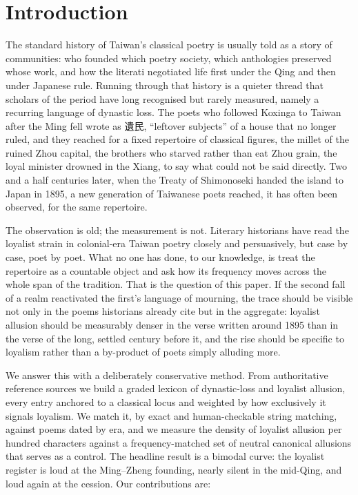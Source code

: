 \documentclass[10pt,twocolumn]{article}
\begin{document}
\section{Introduction}
The standard history of Taiwan's classical poetry is usually told as a story of communities:
who founded which poetry society, which anthologies preserved whose work, and how the
literati negotiated life first under the Qing and then under Japanese rule. Running through
that history is a quieter thread that scholars of the period have long recognised but rarely
measured, namely a recurring language of dynastic loss. The poets who followed Koxinga to
Taiwan after the Ming fell wrote as \mbox{遺民}, ``leftover subjects'' of a house that no
longer ruled, and they reached for a fixed repertoire of classical figures, the millet of
the ruined Zhou capital, the brothers who starved rather than eat Zhou grain, the loyal
minister drowned in the Xiang, to say what could not be said directly. Two and a half
centuries later, when the Treaty of Shimonoseki handed the island to Japan in 1895, a new
generation of Taiwanese poets reached, it has often been observed, for the same repertoire.

The observation is old; the measurement is not. Literary historians have read the loyalist
strain in colonial-era Taiwan poetry closely and persuasively, but case by case, poet by
poet. What no one has done, to our knowledge, is treat the repertoire as a countable object
and ask how its frequency moves across the whole span of the tradition. That is the question
of this paper. If the second fall of a realm reactivated the first's language of mourning,
the trace should be visible not only in the poems historians already cite but in the
aggregate: loyalist allusion should be measurably denser in the verse written around 1895
than in the verse of the long, settled century before it, and the rise should be specific to
loyalism rather than a by-product of poets simply alluding more.

We answer this with a deliberately conservative method. From authoritative reference sources
we build a graded lexicon of dynastic-loss and loyalist allusion, every entry anchored to a
classical locus and weighted by how exclusively it signals loyalism. We match it, by exact
and human-checkable string matching, against poems dated by era, and we measure the density
of loyalist allusion per hundred characters against a frequency-matched set of neutral
canonical allusions that serves as a control. The headline result is a bimodal curve: the
loyalist register is loud at the Ming--Zheng founding, nearly silent in the mid-Qing, and
loud again at the cession. Our contributions are:
\end{document}
